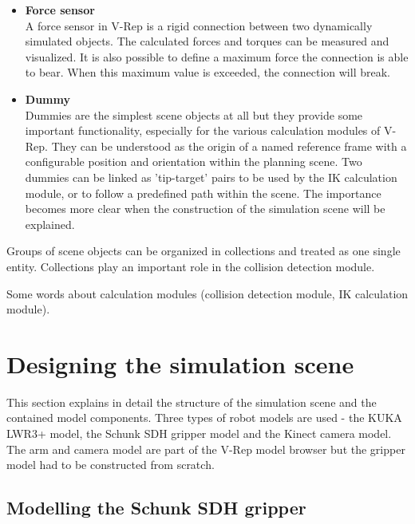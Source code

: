 \begin{itemize}
\item \textbf{Force sensor} \\
A force sensor in V-Rep is a rigid connection between two dynamically simulated objects. The calculated forces and torques can be measured and visualized. It is also possible to define a maximum force the connection is able to bear. When this maximum value is exceeded, the connection will break.

\item \textbf{Dummy} \\
Dummies are the simplest scene objects at all but they provide some important functionality, especially for the various calculation modules of V-Rep. They can be understood as the origin of a named reference frame with a configurable position and orientation within the planning scene. Two dummies can be linked as 'tip-target' pairs to be used by the IK calculation module, or to follow a predefined path within the scene. The importance becomes more clear when the construction of the simulation scene will be explained. 

\end{itemize}

Groups of scene objects can be organized in collections and treated as one single entity. Collections play an important role in the collision detection module.

Some words about calculation modules (collision detection module, IK calculation module).


\section{Designing the simulation scene}
This section explains in detail the structure of the simulation scene and the contained model components. Three types of robot models are used - the KUKA LWR3+ model, the Schunk SDH gripper model and the Kinect camera model. The arm and camera model are part of the V-Rep model browser but the gripper model had to be constructed from scratch.

\subsection{Modelling the Schunk SDH gripper}

